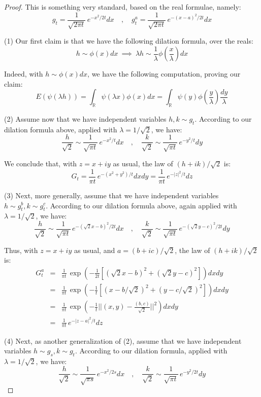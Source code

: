 \documentclass[12pt]{amsbook}
\begin{document}
\begin{proof}
This is something very standard, based on the real formulae, namely:
$$g_t=\frac{1}{\sqrt{2\pi t}}\,e^{-x^2/2t}dx\quad,\quad 
g_t^a=\frac{1}{\sqrt{2\pi t}}\,e^{-(x-a)^2/2t}dx$$

(1) Our first claim is that we have the following dilation formula, over the reals:
$$h\sim\phi(x)dx\ \implies\ \lambda h\sim\frac{1}{\lambda}\phi\left(\frac{x}{\lambda}\right)dx$$

Indeed, with $h\sim\phi(x)dx$, we have the following computation, proving our claim:
$$E(\psi(\lambda h))
=\int_\mathbb R\psi(\lambda x)\phi(x)dx
=\int_\mathbb R\psi(y)\phi\left(\frac{y}{\lambda}\right)\frac{dy}{\lambda}$$

(2) Assume now that we have independent variables $h,k\sim g_t$. According to our dilation formula above, applied with $\lambda=1/\sqrt{2}$, we have:
$$\frac{h}{\sqrt{2}}\sim\frac{1}{\sqrt{\pi t}}\,e^{-x^2/t}dx
\quad,\quad \frac{k}{\sqrt{2}}\sim\frac{1}{\sqrt{\pi t}}\,e^{-y^2/t}dy$$

We conclude that, with $z=x+iy$ as usual, the law of $(h+ik)/\sqrt{2}$ is:
$$G_t=\frac{1}{\pi t}\,e^{-(x^2+y^2)/t}dxdy=\frac{1}{\pi t}\,e^{-|z|^2/t}dz$$

(3) Next, more generally, assume that we have independent variables $h\sim g_t^b,k\sim g_t^c$. According to our dilation formula above, again applied with $\lambda=1/\sqrt{2}$, we have:
$$\frac{h}{\sqrt{2}}\sim\frac{1}{\sqrt{\pi t}}\,e^{-(\sqrt{2}x-b)^2/2t}dx
\quad,\quad \frac{k}{\sqrt{2}}\sim\frac{1}{\sqrt{\pi t}}\,e^{-(\sqrt{2}y-c)^2/2t}dy$$

Thus, with $z=x+iy$ as usual, and $a=(b+ic)/\sqrt{2}$, the law of $(h+ik)/\sqrt{2}$ is:
\begin{eqnarray*}
G_t^a
&=&\frac{1}{\pi t}\,\exp\left(-\frac{1}{2t}\left[(\sqrt{2}x-b)^2+(\sqrt{2}y-c)^2\right]\right)dxdy\\
&=&\frac{1}{\pi t}\,\exp\left(-\frac{1}{t}\left[(x-b/\sqrt{2})^2+(y-c/\sqrt{2})^2\right]\right)dxdy\\
&=&\frac{1}{\pi t}\,\exp\left(-\frac{1}{t}\Big|\Big|(x,y)-\frac{(b,c)}{\sqrt{2}}\Big|\Big|^2\right)dxdy\\
&=&\frac{1}{\pi t}\,e^{-|z-a|^2/t}dz
\end{eqnarray*}

(4) Next, as another generalization of (2), assume that we have independent variables $h\sim g_s,k\sim g_t$. According to our dilation formula, applied with $\lambda=1/\sqrt{2}$, we have:
$$\frac{h}{\sqrt{2}}\sim\frac{1}{\sqrt{\pi s}}\,e^{-x^2/2s}dx
\quad,\quad \frac{k}{\sqrt{2}}\sim\frac{1}{\sqrt{\pi t}}\,e^{-y^2/2t}dy$$


\end{proof}
\end{document}

